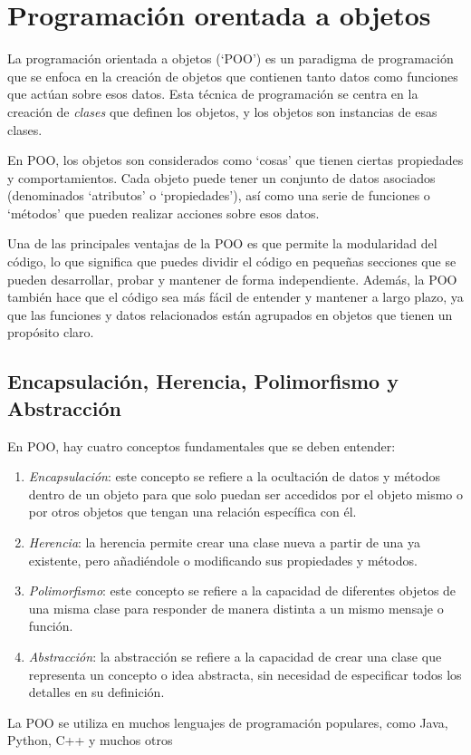 \documentclass[executivepaper]{article}
\begin{document}
\newpage

\section{Programación orentada a objetos}
La programación orientada a objetos (\enquote*{POO}) es un paradigma de programación que se enfoca en la creación de objetos que contienen tanto datos como funciones que actúan sobre esos datos. Esta técnica de programación se centra en la creación de \textit{clases} que definen los objetos, y los objetos son instancias de esas clases.

En POO, los objetos son considerados como \enquote*{cosas} que tienen ciertas propiedades y comportamientos. Cada objeto puede tener un conjunto de datos asociados (denominados \enquote*{atributos} o \enquote*{propiedades}), así como una serie de funciones o \enquote*{métodos} que pueden realizar acciones sobre esos datos.

Una de las principales ventajas de la POO es que permite la modularidad del código, lo que significa que puedes dividir el código en pequeñas secciones que se pueden desarrollar, probar y mantener de forma independiente. Además, la POO también hace que el código sea más fácil de entender y mantener a largo plazo, ya que las funciones y datos relacionados están agrupados en objetos que tienen un propósito claro.

\subsection{Encapsulación, Herencia, Polimorfismo y Abstracción}
En POO, hay cuatro conceptos fundamentales que se deben entender:
\begin{enumerate}
    \item \textit{Encapsulación}: este concepto se refiere a la ocultación de datos y métodos dentro de un objeto para que solo puedan ser accedidos por el objeto mismo o por otros objetos que tengan una relación específica con él.
    \item \textit{Herencia}: la herencia permite crear una clase nueva a partir de una ya existente, pero añadiéndole o modificando sus propiedades y métodos.
    \item \textit{Polimorfismo}: este concepto se refiere a la capacidad de diferentes objetos de una misma clase para responder de manera distinta a un mismo mensaje o función.
    \item \textit{Abstracción}: la abstracción se refiere a la capacidad de crear una clase que representa un concepto o idea abstracta, sin necesidad de especificar todos los detalles en su definición.
\end{enumerate}
La POO se utiliza en muchos lenguajes de programación populares, como Java, Python, C++ y muchos otros
\end{document}

